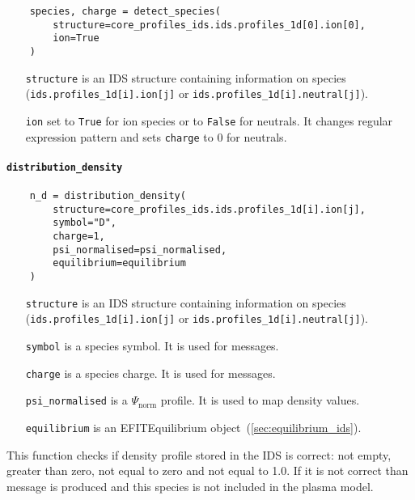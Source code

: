 \documentclass[../../main.tex]{subfiles}
\begin{document}
\begin{verbatim}
    species, charge = detect_species(
        structure=core_profiles_ids.ids.profiles_1d[0].ion[0],
        ion=True
    )
\end{verbatim}

\begin{itemize}[align=left]
    \item[\texttt{structure}] is an IDS structure containing information on species (\texttt{ids.profiles\_1d[i].ion[j]} or \texttt{ids.profiles\_1d[i].neutral[j]}).
    \item[\texttt{ion}] set to \texttt{True} for ion species or to \texttt{False} for neutrals. It changes regular expression pattern and sets \texttt{charge} to 0 for neutrals.
\end{itemize}

\paragraph{\texttt{distribution\_density}}%

\begin{verbatim}
    n_d = distribution_density(
        structure=core_profiles_ids.ids.profiles_1d[i].ion[j],
        symbol="D",
        charge=1,
        psi_normalised=psi_normalised,
        equilibrium=equilibrium
    )
\end{verbatim}

\begin{itemize}[align=left]
    \item[\texttt{structure}] is an IDS structure containing information on species (\texttt{ids.profiles\_1d[i].ion[j]} or \texttt{ids.profiles\_1d[i].neutral[j]}).
    \item[\texttt{symbol}] is a species symbol. It is used for messages.
    \item[\texttt{charge}] is a species charge. It is used for messages.
    \item[\texttt{psi\_normalised}] is a $\Psi_\text{norm}$ profile. It is used to map density values.
    \item[\texttt{equilibrium}] is an EFITEquilibrium object~(\cref{sec:equilibrium_ids}).
\end{itemize}

This function checks if density profile stored in the IDS is correct: not empty, greater than zero, not equal to zero and not equal to 1.0. If it is not correct than message is produced and this species is not included in the plasma model.
\end{document}

